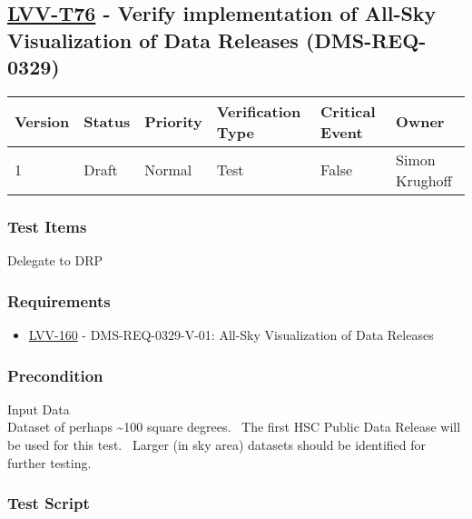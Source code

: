 \hypertarget{lvv-t76---verify-implementation-of-all-sky-visualization-of-data-releases-dms-req-0329}{%
\subsection{\texorpdfstring{\href{https://jira.lsstcorp.org/secure/Tests.jspa\#/testCase/LVV-T76}{LVV-T76}
- Verify implementation of All-Sky Visualization of Data Releases
(DMS-REQ-0329)}{LVV-T76 - Verify implementation of All-Sky Visualization of Data Releases (DMS-REQ-0329)}}\label{lvv-t76---verify-implementation-of-all-sky-visualization-of-data-releases-dms-req-0329}}

\begin{longtable}[]{@{}llllll@{}}
\toprule
Version & Status & Priority & Verification Type & Critical Event &
Owner\tabularnewline
\midrule
\endhead
1 & Draft & Normal & Test & False & Simon Krughoff\tabularnewline
\bottomrule
\end{longtable}

\hypertarget{test-items-52}{%
\subsubsection{Test Items}\label{test-items-52}}

Delegate to DRP

\hypertarget{requirements-53}{%
\subsubsection{Requirements}\label{requirements-53}}

\begin{itemize}
\tightlist
\item
  \href{https://jira.lsstcorp.org/browse/LVV-160}{LVV-160} -
  DMS-REQ-0329-V-01: All-Sky Visualization of Data Releases
\end{itemize}

\hypertarget{precondition-8}{%
\subsubsection{Precondition}\label{precondition-8}}

Input Data\\
Dataset of perhaps \textasciitilde{}100 square degrees. ~The first HSC
Public Data Release will be used for this test. ~Larger (in sky area)
datasets should be identified for further testing.

\hypertarget{test-script-53}{%
\subsubsection{Test Script}\label{test-script-53}}

